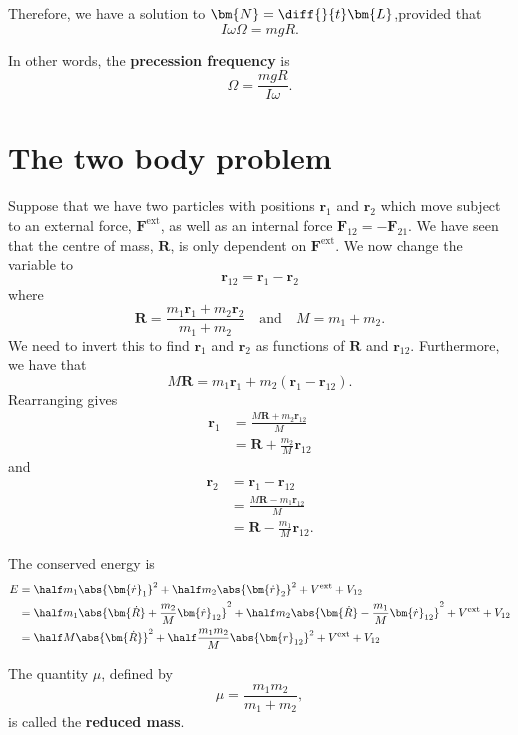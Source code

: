 \documentclass[12pt, a4paper]{article}
\begin{document}
Therefore, we have a solution to \(\bm{N} = \diff{}{t} \bm{L}\),provided that  
\[I\omega \Omega = mgR.\]

In other words, the \textbf{precession frequency} is 
\[\Omega = \frac{mgR}{I\omega}.\]

\section{The two body problem}

Suppose that we have two particles with positions \(\bm{r}_1\) and \(\bm{r}_2\) which move subject to an external force, \(\bm{F}^{\text{ext}}\), as well as an internal force \(\bm{F}_{12} = - \bm{F}_{21}\). We have seen that the centre of mass, \(\bm{R}\), is only dependent on \(\bm{F}^{\text{ext}}\). We now change the variable to 
\[\bm{r}_{12} = \bm{r}_1 - \bm{r}_2\]
where 
\[\bm{R} = \frac{m_1 \bm{r}_1 +m_2 \bm{r}_2}{m_1+m_2} \quad \text{and} \quad M=m_1+m_2.\]
We need to invert this to find \(\bm{r}_1\) and \(\bm{r}_2\) as functions of \(\bm{R}\) and \(\bm{r}_{12}\). Furthermore, we have that 
\[M \bm{R} = m_1 \bm{r}_1 +m_2(\bm{r}_1-\bm{r}_{12}).\]
Rearranging gives 
\[\begin{aligned}
    \bm{r}_1 &=  \frac{M\bm{R} + m_2 \bm{r}_{12}}{M} \\
            &= \bm{R} + \frac{m_2}{M}\bm{r}_{12}
\end{aligned}\]
and 
\[\begin{aligned}
    \bm{r}_2 &= \bm{r}_1 - \bm{r}_{12} \\
    &= \frac{M\bm{R} - m_1 \bm{r}_{12}}{M} \\
    &= \bm{R} - \frac{m_1}{M}\bm{r}_{12}.
\end{aligned}\]

The conserved energy is 
\[\begin{aligned}
    E &= \half m_1 \abs{\bm{\dot{r}}_1}^2 + \half m_2 \abs{\bm{\dot{r}}_2}^2 + V^{\text{ext}} +V_{12} \\
    &= \half m_1 \abs{\bm{\dot{R}}+ \frac{m_2}{M} \bm{\dot{r}}_{12}}^2 + \half m_2 \abs{\bm{\dot{R}}- \frac{m_1}{M}\bm{\dot{r}}_{12}}^2 +V^{\text{ext}} + V_{12} \\
    &= \half M \abs{\bm{\dot{R}}}^2 + \half \frac{m_1 m_2}{M} \abs{\bm{r}_{12}}^2 +V^{\text{ext}}+V_{12} \\
\end{aligned}\]

\begin{definition}
    The quantity \(\mu\), defined by
    \[\mu = \frac{m_1m_2}{m_1+m_2},\]
    is called the \textbf{reduced mass}.
\end{definition}
\end{document}
